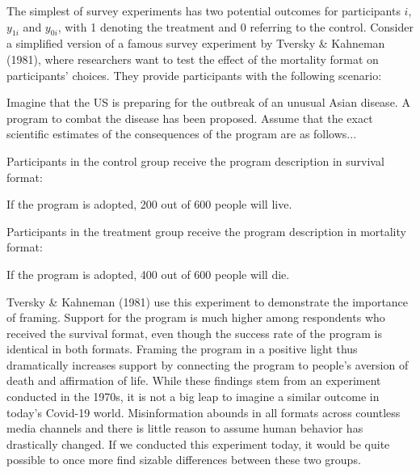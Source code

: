 \documentclass[12pt,econ]{sources/authesis}
\begin{document}
The simplest of survey experiments has two potential outcomes for participants \(i\), \(y_{1i}\) and \(y_{0i}\), with 1 denoting the treatment and 0 referring to the control. Consider a simplified version of a famous survey experiment by Tversky \& Kahneman (1981), where researchers want to test the effect of the mortality format on participants' choices.\label{death} They provide participants with the following scenario:

\vspace{0.3cm}
\begin{adjustwidth}{50pt}{50pt}
\ssp
\noindent Imagine that the US is preparing for the outbreak of an unusual Asian disease. A program to combat the disease has been proposed. Assume that the exact scientific estimates of the consequences of the program are as follows...
\end{adjustwidth}
Participants in the control group receive the program description in survival format:

\vspace{0.3cm}
\begin{adjustwidth}{50pt}{50pt}
\ssp
\noindent If the program is adopted, 200 out of 600 people will live.
\end{adjustwidth}
Participants in the treatment group receive the program description in mortality format:

\vspace{0.3cm}
\begin{adjustwidth}{50pt}{50pt}
\ssp
\noindent If the program is adopted, 400 out of 600 people will die.
\end{adjustwidth}
Tversky \& Kahneman (1981) use this experiment to demonstrate the importance of framing. Support for the program is much higher among respondents who received the survival format, even though the success rate of the program is identical in both formats. Framing the program in a positive light thus dramatically increases support by connecting the program to people's aversion of death and affirmation of life. While these findings stem from an experiment conducted in the 1970s, it is not a big leap to imagine a similar outcome in today's Covid-19 world. Misinformation abounds in all formats across countless media channels and there is little reason to assume human behavior has drastically changed. If we conducted this experiment today, it would be quite possible to once more find sizable differences between these two groups.
\end{document}
